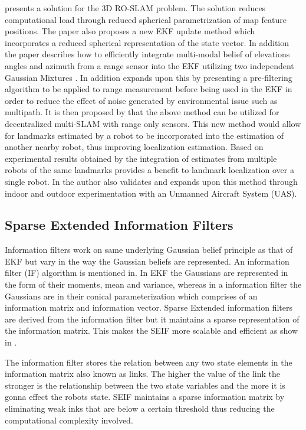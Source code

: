 \documentclass[conference]{IEEEtran}
\begin{document}
	\cite{Fabresse2013} presents a solution for the 3D RO-SLAM problem. The solution reduces computational load through reduced spherical parametrization of map feature positions. The paper also proposes a new EKF update method which incorporates a reduced spherical representation of the state vector. In addition the paper describes how to efficiently integrate multi-modal belief of elevations angles and azimuth from a range sensor into the EKF utilizing two independent Gaussian Mixtures \cite{Fabresse2013}. In addition \cite{Fabresse2014} expands upon this by presenting a pre-filtering algorithm to be applied to range measurement before being used in the EKF in order to reduce the effect of noise generated by environmental issue such as multipath. It is then proposed by \cite{Fabresse2015} that the above method can be utilized for decentralized multi-SLAM with range only sensors. This new method would allow for landmarks estimated by a robot to be incorporated into the estimation of another nearby robot, thus improving localization estimation. Based on experimental results obtained by \cite{Fabresse2015} the integration of estimates from multiple robots of the same landmarks provides a benefit to landmark localization over a single robot. In \cite{Fabresse2016} the author also validates and expands upon this method through indoor and outdoor experimentation with an Unmanned Aircraft System (UAS).  
	
\subsection{Sparse Extended Information Filters}

Information filters work on same underlying Gaussian belief principle as that of EKF but vary in the way the Gaussian beliefs are represented. An information filter (IF) algorithm is mentioned in\cite{Torres-Gonzalez2014}. In EKF the Gaussians are represented in the form of their moments, mean and variance, whereas in a information filter the Gaussians are in their conical parameterization which comprises of an information matrix and information vector. 
Sparse Extended information filters are derived from the  information filter but it maintains a sparse representation of the information matrix. This makes the SEIF more scalable and efficient as show in \cite{Torres-Gonzalez2014}.

The information filter stores the relation between any two state elements in the information matrix also known as links. The higher the value of the link the stronger is the relationship between the two state variables and the more it is gonna effect the robots state. SEIF maintains a sparse information matrix by eliminating weak inks that are below a certain threshold thus reducing the computational complexity involved.
\end{document}
